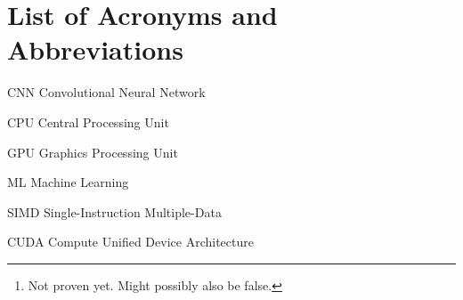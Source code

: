\documentclass[12pt,twoside]{article}
\begin{document}
\maketitle


\begin{abstract}
\label{sec:abstract}

We compare three dynamic memory allocators designed for running on GPUs and select the best performing under TensorFlow’s Convolutional Neural Network (CNN) benchmark, running the ResNet-50 and AlexNet models. The main metric of comparison is the number of images per second processed by the benchmark. Other metrics studied are: object sizes requested for allocation by the benchmark and the frequency in allocation request and in the sizes used. After our performance analysis, we conclude that \texttt{Halloc} algorithm is better than the already used algorithms by TensorFlow, \texttt{CUDAMalloc} and \texttt{BFCMalloc}, in the context of the benchmark itself.\footnote{Not proven yet. Might possibly also be false.}.

\textbf{Keywords:} Algorithm, Performance, Machine learning, GPU, Dynamic memory, Allocation, TensorFlow

\end{abstract}

\tableofcontents

\section*{List of Acronyms and Abbreviations}
\label{list-of-acronyms-and-abbreviations}

\begin{basedescript}{\desclabelstyle{\pushlabel}\desclabelwidth{10em}}
\item[CNN]					Convolutional Neural Network
\item[CPU]                  Central Processing Unit
\item[GPU]                  Graphics Processing Unit
\item[ML]                   Machine Learning
\item[SIMD]                 Single-Instruction Multiple-Data
\item[CUDA]                 Compute Unified Device Architecture
\end{basedescript}




\end{document}
